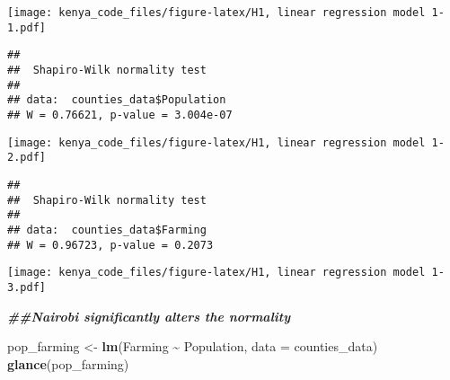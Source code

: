 \documentclass[
]{article}
\newenvironment{Shaded}{\begin{snugshade}}{\end{snugshade}}
\newcommand{\AttributeTok}[1]{\textcolor[rgb]{0.13,0.29,0.53}{#1}}
\newcommand{\CommentTok}[1]{\textcolor[rgb]{0.56,0.35,0.01}{\textit{#1}}}
\newcommand{\DocumentationTok}[1]{\textcolor[rgb]{0.56,0.35,0.01}{\textbf{\textit{#1}}}}
\newcommand{\FunctionTok}[1]{\textcolor[rgb]{0.13,0.29,0.53}{\textbf{#1}}}
\newcommand{\NormalTok}[1]{#1}
\newcommand{\OtherTok}[1]{\textcolor[rgb]{0.56,0.35,0.01}{#1}}
\newcommand{\SpecialCharTok}[1]{\textcolor[rgb]{0.81,0.36,0.00}{\textbf{#1}}}
\begin{document}
\texttt{[image: kenya\_code\_files/figure-latex/H1, linear regression model 1-1.pdf]}

\begin{Shaded}
\end{Shaded}

\begin{verbatim}
## 
##  Shapiro-Wilk normality test
## 
## data:  counties_data$Population
## W = 0.76621, p-value = 3.004e-07
\end{verbatim}

\begin{Shaded}
\end{Shaded}

\texttt{[image: kenya\_code\_files/figure-latex/H1, linear regression model 1-2.pdf]}

\begin{Shaded}
\end{Shaded}

\begin{verbatim}
## 
##  Shapiro-Wilk normality test
## 
## data:  counties_data$Farming
## W = 0.96723, p-value = 0.2073
\end{verbatim}

\begin{Shaded}
\end{Shaded}

\texttt{[image: kenya\_code\_files/figure-latex/H1, linear regression model 1-3.pdf]}

\begin{Shaded}
\begin{Highlighting}[]
\DocumentationTok{\#\#Nairobi significantly alters the normality}

\NormalTok{pop\_farming }\OtherTok{\textless{}{-}} \FunctionTok{lm}\NormalTok{(Farming }\SpecialCharTok{\textasciitilde{}}\NormalTok{ Population, }\AttributeTok{data =}\NormalTok{ counties\_data)}
\FunctionTok{glance}\NormalTok{(pop\_farming)}
\end{Highlighting}
\end{Shaded}
\end{document}
